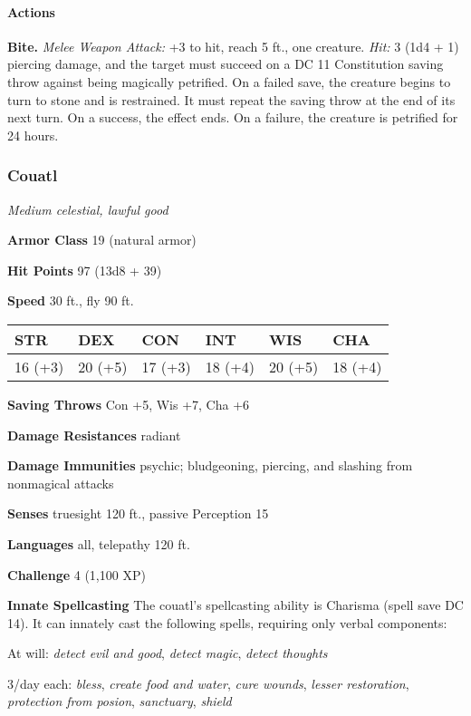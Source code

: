 \documentclass[
]{article}
\begin{document}
\hypertarget{actions-4}{%
\paragraph{Actions}\label{actions-4}}

\textbf{Bite.} \emph{Melee Weapon Attack:} +3 to hit, reach 5 ft., one
creature. \emph{Hit:} 3 (1d4 + 1) piercing damage, and the target must
succeed on a DC 11 Constitution saving throw against being magically
petrified. On a failed save, the creature begins to turn to stone and is
restrained. It must repeat the saving throw at the end of its next turn.
On a success, the effect ends. On a failure, the creature is petrified
for 24 hours.

\hypertarget{couatl}{%
\subsubsection{Couatl}\label{couatl}}

\emph{Medium celestial, lawful good}

\textbf{Armor Class} 19 (natural armor)

\textbf{Hit Points} 97 (13d8 + 39)

\textbf{Speed} 30 ft., fly 90 ft.

\begin{longtable}[]{@{}llllll@{}}
\toprule
STR & DEX & CON & INT & WIS & CHA\tabularnewline
\midrule
\endhead
16 (+3) & 20 (+5) & 17 (+3) & 18 (+4) & 20 (+5) & 18 (+4)\tabularnewline
\bottomrule
\end{longtable}

\textbf{Saving Throws} Con +5, Wis +7, Cha +6

\textbf{Damage Resistances} radiant

\textbf{Damage Immunities} psychic; bludgeoning, piercing, and slashing
from nonmagical attacks

\textbf{Senses} truesight 120 ft., passive Perception 15

\textbf{Languages} all, telepathy 120 ft.

\textbf{Challenge} 4 (1,100 XP)

\textbf{Innate Spellcasting} The couatl's spellcasting ability is
Charisma (spell save DC 14). It can innately cast the following spells,
requiring only verbal components:

At will: \emph{detect evil and good}, \emph{detect magic}, \emph{detect
thoughts}

3/day each: \emph{bless}, \emph{create food and water}, \emph{cure
wounds}, \emph{lesser restoration}, \emph{protection from posion},
\emph{sanctuary}, \emph{shield}
\end{document}

